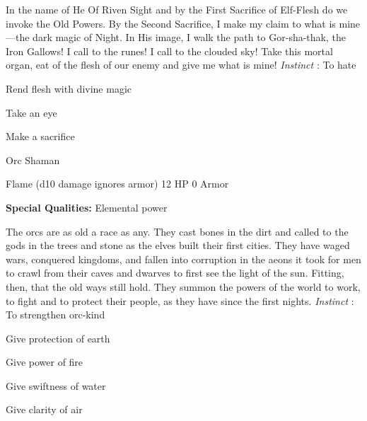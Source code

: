 \startMonsterDescription
In the name of He Of Riven Sight and by the First Sacrifice of Elf-Flesh do we invoke the Old Powers. By the Second Sacrifice, I make my claim to what is mine—the dark magic of Night. In His image, I walk the path to Gor-sha-thak, the Iron Gallows! I call to the runes! I call to the clouded sky! Take this mortal organ, eat of the flesh of our enemy and give me what is mine! {\em Instinct} : To hate
\stopMonsterDescription
       
\startitemize[1,packed]
         
\item Rend flesh with divine magic

         
\item Take an eye

         
\item Make a sacrifice

       
\stopitemize
       
\startMonsterName
Orc Shaman	 
\stopMonsterName
       

Flame (d10 damage ignores armor)	12 HP	0 Armor

       


       
\startMonsterQualities
         {\bf Special Qualities:}  Elemental power
\stopMonsterQualities
       
\startMonsterDescription
The orcs are as old a race as any. They cast bones in the dirt and called to the gods in the trees and stone as the elves built their first cities. They have waged wars, conquered kingdoms, and fallen into corruption in the aeons it took for men to crawl from their caves and dwarves to first see the light of the sun. Fitting, then, that the old ways still hold. They summon the powers of the world to work, to fight and to protect their people, as they have since the first nights. {\em Instinct} : To strengthen orc-kind
\stopMonsterDescription
       
\startitemize[1,packed]
         
\item Give protection of earth

         
\item Give power of fire

         
\item Give swiftness of water

         
\item Give clarity of air

